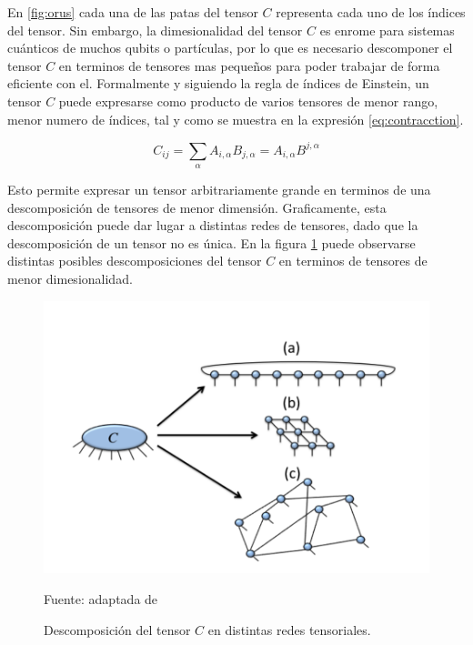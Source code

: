 \newpage

En \ref{fig:orus} cada una de las patas del tensor $C$ representa cada uno de los índices del tensor. Sin embargo, la dimesionalidad del tensor $C$ es enrome para sistemas cuánticos de muchos qubits o partículas, por lo que es necesario descomponer el tensor $C$ en terminos de tensores mas pequeños para poder trabajar de forma eficiente con el. Formalmente y siguiendo la regla de índices de Einstein, un tensor $C$ puede expresarse como producto de varios tensores de menor rango, menor numero de índices, tal y como se muestra en la expresión \ref{eq:contracction}.

\begin{equation}
    C_{i j} = \sum_{\alpha} A_{i , \alpha} B_{j, \alpha} = A_{i , \alpha} B^{j, \alpha}
    \label{eq:contracction}
\end{equation}

Esto permite expresar un tensor arbitrariamente grande en terminos de una descomposición de tensores de menor dimensión. Graficamente, esta descomposición puede dar lugar a distintas redes de tensores, dado que la descomposición de un tensor no es única. En la figura \ref{fig:c_descomposition} puede observarse distintas posibles descomposiciones del tensor $C$ en terminos de tensores de menor dimesionalidad.


\begin{figure}[!ht]
    \centering
    \includegraphics[scale = 0.7]{img/03-tensor_descomposicion.png}
    \caption{Descomposición del tensor $C$ en distintas redes tensoriales.}
    Fuente: adaptada de \citep{orus} 
    \label{fig:c_descomposition}
\end{figure}

